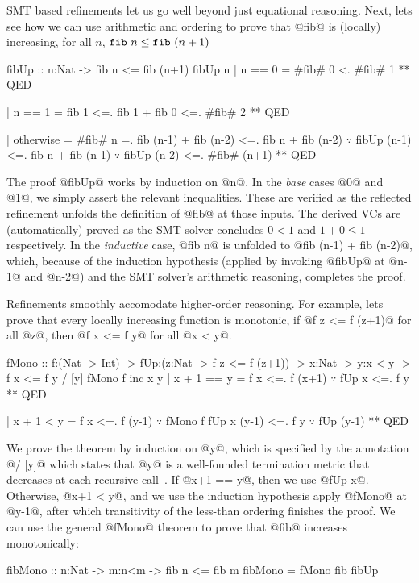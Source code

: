 %
SMT based refinements let us go well beyond just equational
reasoning. Next, lets see how we can use arithmetic and
ordering to prove that @fib@ is (locally) increasing,
%
\ie for all $n$, $\texttt{fib}\ {n} \leq \texttt{fib}\ {(n+1)}$
%
\begin{mcode}
  fibUp :: n:Nat -> { fib n <= fib (n+1) }
  fibUp n
    | n == 0
    =  #fib# 0 <. #fib# 1
    ** QED

    | n == 1
    =  fib 1 <=. fib 1 + fib 0 <=. #fib# 2
    ** QED

    | otherwise
    =  #fib# n
    =. fib (n-1) + fib (n-2)
    <=. fib n     + fib (n-2) $\because$ fibUp (n-1)
    <=. fib n     + fib (n-1) $\because$ fibUp (n-2)
    <=. #fib# (n+1)
    ** QED
\end{mcode} %

%
The proof @fibUp@ works by induction on @n@.
%
In the \emph{base} cases @0@ and @1@, we simply assert
the relevant inequalities. These are verified as the
reflected refinement unfolds the definition of
@fib@ at those inputs.
%
The derived VCs are (automatically) proved
as the SMT solver concludes $0 < 1$ and $1 + 0 \leq 1$
respectively.
%
In the \emph{inductive} case, @fib n@ is unfolded
to  @fib (n-1) + fib (n-2)@, which, because of the
induction hypothesis (applied by invoking @fibUp@
at @n-1@ and @n-2@) and the SMT solver's arithmetic
reasoning, completes the proof.

%
Refinements smoothly accomodate higher-order reasoning.
%
For example, lets prove that every locally increasing
function is monotonic, \ie
if @f z <= f (z+1)@ for all @z@,
then @f x <= f y@ for all @x < y@.
%
\begin{mcode}
  fMono :: f:(Nat -> Int)
        -> fUp:(z:Nat -> {f z <= f (z+1)})
        -> x:Nat
        -> y:{x < y}
        -> {f x <= f y} / [y]
  fMono f inc x y
    | x + 1 == y
    =  f x <=. f (x+1) $\because$ fUp x
           <=. f y
           ** QED

    | x + 1 < y
    =  f x <=. f (y-1) $\because$ fMono f fUp x (y-1)
           <=. f y     $\because$ fUp (y-1)
           ** QED
\end{mcode}
%
We prove the theorem by induction
on @y@, which is specified by the
annotation @/ [y]@ which states
that @y@ is a well-founded
termination metric that decreases
at each recursive call~\citep{Vazou14}.
%
%
If @x+1 == y@, then we use @fUp x@.
%
Otherwise, @x+1 < y@, and we use
the induction hypothesis \ie apply
@fMono@ at @y-1@, after which
transitivity of the less-than
ordering finishes the proof.
%
We can use the general @fMono@
theorem to prove that @fib@
increases monotonically:
%
\begin{code}
  fibMono :: n:Nat -> m:{n<m} -> {fib n <= fib m}
  fibMono = fMono fib fibUp
\end{code}


